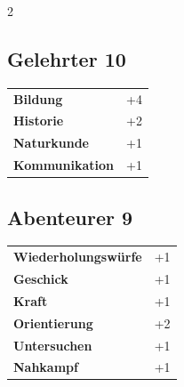 \begin{multicols}{2}
\begin{tcolorbox}

\end{tcolorbox}

\begin{tcolorbox}
    \subsection*{Gelehrter \hfill \small{10 }}
    \tcblower




\begin{tabular}{@{}ll@{}}
    \textbf{Bildung} & +4\\
    \textbf{Historie} & +2\\
    \textbf{Naturkunde} & +1\\
    \textbf{Kommunikation} & +1\\
\end{tabular}


\end{tcolorbox}

\begin{tcolorbox}
    \subsection*{Abenteurer \hfill \small{9 }}
    \tcblower




\begin{tabular}{@{}ll@{}}
    \textbf{Wiederholungswürfe} & +1\\
    \textbf{Geschick} & +1\\
    \textbf{Kraft} & +1\\
    \textbf{Orientierung} & +2\\
    \textbf{Untersuchen} & +1\\
    \textbf{Nahkampf} & +1\\
\end{tabular}



\end{tcolorbox}
\end{multicols}
